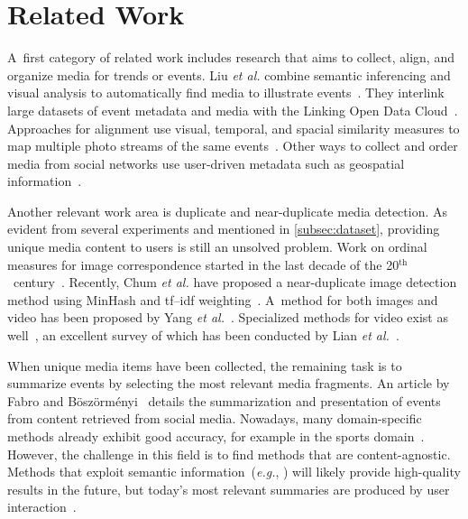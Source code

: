 \documentclass{acm_proc_article-sp}
\let\oldemph\emph
\renewcommand{\emph}[1]{\oldemph{\fontsize{9}{9}\selectfont #1}}
\newcommand{\superscript}[1]{\ensuremath{^{\textrm{#1}}}}
\begin{document}
\section{Related Work} \label{sec:relatedwork}


A~first category of related work includes research that aims to collect, align, and organize media for trends or events.
Liu \emph{et al.} combine semantic inferencing and visual analysis to automatically find media to illustrate events~\cite{Liu2011}.
They interlink large datasets of event metadata and media with the Linking Open Data Cloud~\cite{LODcloud}.
Approaches for alignment use visual, temporal, and spacial similarity measures to map multiple photo streams of the same events~\cite{Yang2011}.
Other ways to collect and order media from social networks use user-driven metadata such as geospatial information~\cite{Crandall}.

Another relevant work area is duplicate and near-duplicate media detection.
As evident from several experiments and mentioned in \autoref{subsec:dataset},
providing unique media content to users is still an unsolved problem.
Work on ordinal measures for image correspondence started in the last decade of the 20\superscript{th}~century~\cite{Bhat}.
Recently, Chum \emph{et al.} have proposed a near-duplicate image detection method using MinHash and tf--idf weighting~\cite{Chum}.
A~method for both images and video has been proposed by Yang \emph{et al.}~\cite{Yang}.
Specialized methods for video exist as well~\cite{Min, Wu}, an excellent survey of which has been conducted by Lian \emph{et al.}~\cite{Lian}.

When unique media items have been collected, the remaining task is to summarize events by selecting the most relevant media fragments.
An article by Fabro and B\"osz\"orm\'enyi~\cite{Fabro2012} details the summarization and presentation of events from content retrieved from social media.
Nowadays, many domain-specific methods already exhibit good accuracy, for example in the sports domain~\cite{Li1,Li2}.
However, the challenge in this field is to find methods that are content-agnostic.
Methods that exploit semantic information~(\emph{e.g.}, \cite{Chen}) will likely provide high-quality results in the future,
but today's most relevant summaries are produced by user interaction~\cite{Olsen}.
\end{document}
